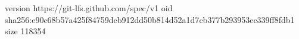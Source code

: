 version https://git-lfs.github.com/spec/v1
oid sha256:e90c68b57a425f84759dcb912dd50b814d52a1d7cb377b293953ec339ff8fdb1
size 118354
